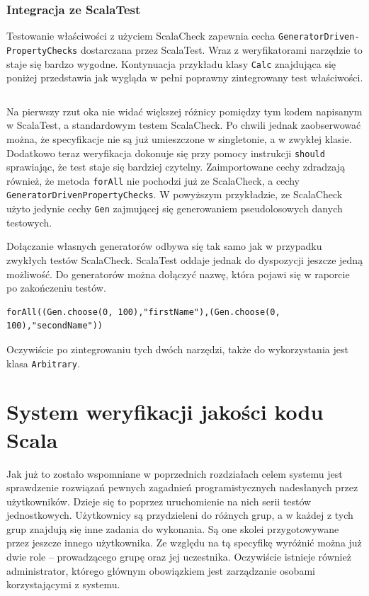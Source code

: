 \documentclass[brudnopis]{xmgr}
\begin{document}
\subsection{Integracja ze ScalaTest}

Testowanie właściwości z użyciem ScalaCheck zapewnia cecha \texttt{GeneratorDriven-\newline PropertyChecks} dostarczana przez ScalaTest. Wraz z weryfikatorami narzędzie to staje się bardzo wygodne. Kontynuacja przykładu klasy \texttt{Calc} znajdująca się poniżej przedstawia jak wygląda w pełni poprawny zintegrowany test właściwości. 

\inputminted[fontsize=\small]{scala}{code/CalcTestScalaTest.scala}

Na pierwszy rzut oka nie widać większej różnicy pomiędzy tym kodem napisanym w ScalaTest, a standardowym testem ScalaCheck. Po chwili jednak zaobserwować można, że specyfikacje nie są już umieszczone w singletonie, a w zwykłej klasie. Dodatkowo teraz weryfikacja dokonuje się przy pomocy instrukcji \texttt{should} sprawiając, że test staje się bardziej czytelny. Zaimportowane cechy zdradzają również, że metoda \texttt{forAll} nie pochodzi już ze ScalaCheck, a cechy \texttt{GeneratorDrivenPropertyChecks}. W powyższym przykładzie, ze ScalaCheck użyto jedynie cechy \texttt{Gen} zajmującej się generowaniem pseudolosowych danych testowych.

Dołączanie własnych generatorów odbywa się tak samo jak w przypadku zwykłych testów ScalaCheck. ScalaTest oddaje jednak do dyspozycji jeszcze jedną możliwość. Do generatorów można dołączyć nazwę, która pojawi się w raporcie po zakończeniu testów.

\begin{verbatim}
forAll((Gen.choose(0, 100),"firstName"),(Gen.choose(0, 100),"secondName"))
\end{verbatim}

Oczywiście po zintegrowaniu tych dwóch narzędzi, także do wykorzystania jest klasa \texttt{Arbitrary}.

\chapter{System weryfikacji jakości kodu Scala}

Jak już to zostało wspomniane w poprzednich rozdziałach celem systemu jest sprawdzenie rozwiązań pewnych zagadnień programistycznych nadesłanych przez użytkowników. Dzieje się to poprzez uruchomienie na nich serii testów jednostkowych. Użytkownicy są przydzieleni do różnych grup, a w każdej z tych grup znajdują się inne zadania do wykonania. Są one skolei przygotowywane przez jeszcze innego użytkownika. Ze względu na tą specyfikę wyróżnić można już dwie role -- prowadzącego grupę oraz jej uczestnika. Oczywiście istnieje również administrator, którego głównym obowiązkiem jest zarządzanie osobami korzystającymi z systemu.
\end{document}
